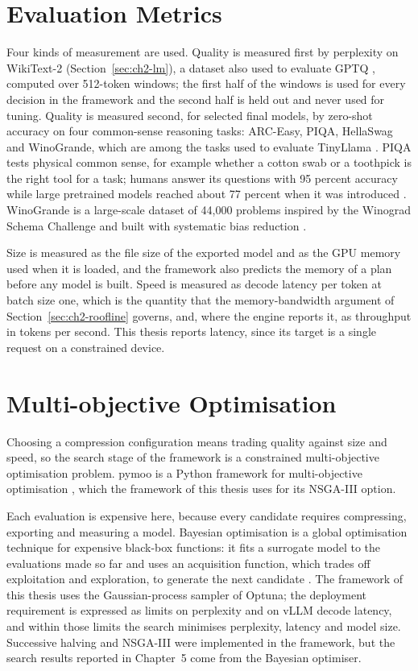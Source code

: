 \documentclass[
11pt, %
english, %
singlespacing, %
headsepline, %
]{MastersDoctoralThesis} %
\begin{document}
\section{Evaluation Metrics}
\label{sec:ch2-metrics}

Four kinds of measurement are used. Quality is measured first by perplexity on WikiText-2 (Section~\ref{sec:ch2-lm}), a dataset also used to evaluate GPTQ \cite{frantar2023gptq}, computed over 512-token windows; the first half of the windows is used for every decision in the framework and the second half is held out and never used for tuning. Quality is measured second, for selected final models, by zero-shot accuracy on four common-sense reasoning tasks: ARC-Easy, PIQA, HellaSwag and WinoGrande, which are among the tasks used to evaluate TinyLlama \cite{zhang2024tinyllama}. PIQA tests physical common sense, for example whether a cotton swab or a toothpick is the right tool for a task; humans answer its questions with 95 percent accuracy while large pretrained models reached about 77 percent when it was introduced \cite{bisk2020piqa}. WinoGrande is a large-scale dataset of 44{,}000 problems inspired by the Winograd Schema Challenge and built with systematic bias reduction \cite{sakaguchi2020winogrande}.

Size is measured as the file size of the exported model and as the GPU memory used when it is loaded, and the framework also predicts the memory of a plan before any model is built. Speed is measured as decode latency per token at batch size one, which is the quantity that the memory-bandwidth argument of Section~\ref{sec:ch2-roofline} governs, and, where the engine reports it, as throughput in tokens per second. This thesis reports latency, since its target is a single request on a constrained device.

\section{Multi-objective Optimisation}
\label{sec:ch2-moo}

Choosing a compression configuration means trading quality against size and speed, so the search stage of the framework is a constrained multi-objective optimisation problem. pymoo is a Python framework for multi-objective optimisation \cite{blank2020pymoo}, which the framework of this thesis uses for its NSGA-III option.

Each evaluation is expensive here, because every candidate requires compressing, exporting and measuring a model. Bayesian optimisation is a global optimisation technique for expensive black-box functions: it fits a surrogate model to the evaluations made so far and uses an acquisition function, which trades off exploitation and exploration, to generate the next candidate \cite{bischl2021hpo}. The framework of this thesis uses the Gaussian-process sampler of Optuna; the deployment requirement is expressed as limits on perplexity and on vLLM decode latency, and within those limits the search minimises perplexity, latency and model size. Successive halving \cite{bischl2021hpo} and NSGA-III were implemented in the framework, but the search results reported in Chapter~5 come from the Bayesian optimiser.
\end{document}
